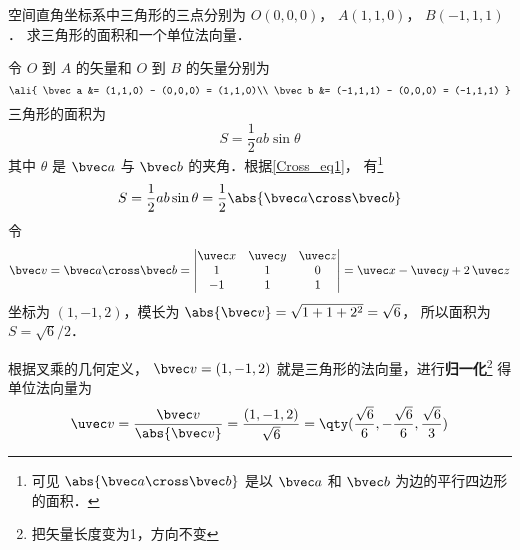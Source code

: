 \begin{example}{}\label{Cross_exe1}
空间直角坐标系中三角形的三点分别为 $O(0,0,0)$，  $A(1,1,0)$，  $B(-1,1,1)$． 求三角形的面积和一个单位法向量．

令 $O$ 到 $A$ 的矢量和  $O$ 到 $B$ 的矢量分别为
\begin{equation}
\ali{
\bvec a  &= (1,1,0) - (0,0,0) = (1,1,0)\\
\bvec b  &= (-1,1,1) - (0,0,0) = (-1,1,1)
}\end{equation}
三角形的面积为
 \begin{equation}
S = \frac12 ab \sin \theta 
\end{equation}
其中 $\theta $ 是 $\bvec a$ 与 $\bvec b$ 的夹角．根据\autoref{Cross_eq1}， 有\footnote{可见 $\abs{\bvec a\cross\bvec b}$ 是以 $\bvec a$ 和 $\bvec b$ 为边的平行四边形的面积．}
\begin{equation}
S = \frac12 ab \sin \theta  = \frac12 \abs{\bvec a\cross\bvec b}
\end{equation}
令
\begin{equation}
\bvec v = \bvec a \cross \bvec b = 
\begin{vmatrix} \uvec x & \uvec y & \uvec z \\ 1&1&0\\-1&1&1 \end{vmatrix}
= \uvec x - \uvec y + 2\,\uvec z 
\end{equation}
坐标为 $(1,-1,2)$，模长为 $\abs{\bvec v} = \sqrt{1 + 1 + 2^2} = \sqrt 6$， 所以面积为 $S = \sqrt 6 /2$． 

根据叉乘的几何定义， $\bvec v = (1,-1,2)$ 就是三角形的法向量，进行\textbf{归一化}\footnote{把矢量长度变为1，方向不变}
得单位法向量为
 \begin{equation}
\uvec v = \frac{\bvec v}{\abs{\bvec v}} = \frac{(1,-1,2)}{\sqrt 6} = \qty( \frac{\sqrt 6 }{6}, - \frac{\sqrt 6 }{6}, \frac{\sqrt 6 }{3} )
\end{equation}
\end{example}



